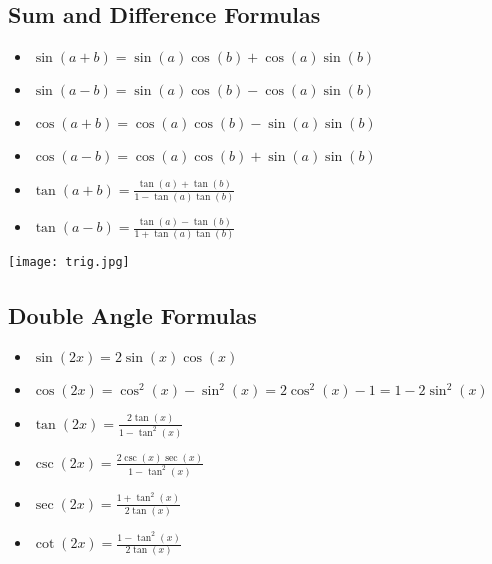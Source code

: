 \subsection{Sum and Difference Formulas}
\begin{itemize}[label=\(-\)]
    \item \( \sin(a + b) = \sin(a)\cos(b) + \cos(a)\sin(b) \)
    \item \( \sin(a - b) = \sin(a)\cos(b) - \cos(a)\sin(b) \)
    \item \( \cos(a + b) = \cos(a)\cos(b) - \sin(a)\sin(b) \)
    \item \( \cos(a - b) = \cos(a)\cos(b) + \sin(a)\sin(b) \)
    \item \( \tan(a + b) = \frac{\tan(a) + \tan(b)}{1 - \tan(a)\tan(b)}\)
    \item \( \tan(a - b) = \frac{\tan(a) - \tan(b)}{1 + \tan(a)\tan(b)}\)
\end{itemize}

\begin{center}
\texttt{[image: trig.jpg]}
\end{center}

\subsection{Double Angle Formulas}
\begin{itemize}[label=\(-\)]
    \item \( \sin(2x) = 2\sin(x)\cos(x) \)
    \item \( \cos(2x) = \cos^2(x) - \sin^2(x) = 2\cos^2(x) - 1 = 1 - 2\sin^2(x) \)
    \item \( \tan(2x) = \frac{2\tan(x)}{1 - \tan^2(x)}\)
    \item \( \csc(2x) = \frac{2\csc(x)\sec(x)}{1 - \tan^2(x)}\)
    \item \( \sec(2x) = \frac{1 + \tan^2(x)}{2\tan(x)}\)
    \item \( \cot(2x) = \frac{1 - \tan^2(x)}{2\tan(x)}\)
\end{itemize}

